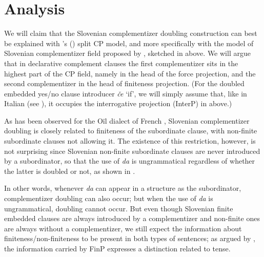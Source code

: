 \documentclass[output=paper,
]{langscibook}
\begin{document}
\section{Analysis}\label{sec:plesnicar:s5}
We will claim that the Slovenian complementizer doubling construction can best be explained with \citeauthor{rizzi1997}'s (\citeyear{rizzi1997, rizzi2001}) split CP model, and more specifically with the model of Slovenian complementizer field proposed by \cite{mismas2015}, sketched in  above. We will argue that in declarative complement clauses the first complementizer sits in the highest part of the CP field, namely in the head of the force projection, and the second complementizer in the head of finiteness projection. (For the doubled embedded yes/no clause introducer \textit{če} `if', we will simply assume that, like in Italian (see \citealt{rizzi2001}), it occupies the interrogative projection (InterP) in  above.)

As has been observed for the Oïl dialect of French \citep{dagnac2012}, Slovenian complementizer doubling is closely related to finiteness of the subordinate clause, with non-finite subordinate clauses not allowing it. The existence of this restriction, however, is not surprising since Slovenian non-finite subordinate clauses are never introduced by a subordinator, so that the use of \textit{da} is ungrammatical regardless of whether the latter is doubled or not, as shown in . 

\begin{exe} 
\end{exe}

\noindent In other words, whenever \textit{da} can appear in a structure as the subordinator, complementizer doubling can also occur; but when the use of \textit{da} is ungrammatical, doubling cannot occur. But even though Slovenian finite embedded clauses are always introduced by a complementizer and non-finite ones are always without a complementizer, we still expect the information about finiteness/non-finiteness to be present in both types of sentences; as argued by \cite{rizzi1997}, the information carried by FinP expresses a distinction related to tense. 
\end{document}
